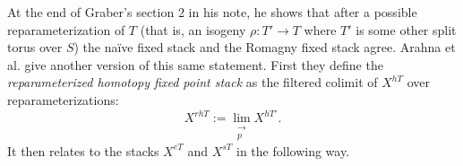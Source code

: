 At the end of Graber's section 2 in his note, he shows that after a possible reparameterization of \(T\) (that is, an isogeny \(\rho:T'\to T\) where \(T'\) is some other split torus over \(S\)) the na\"ive fixed stack and the Romagny fixed stack agree. Arahna et al. give another version of this same statement. First they define the \emph{reparameterized homotopy fixed point stack} as the filtered colimit of \(X^{hT}\) over reparameterizations:
\[X^{rhT} := \lim_{\substack{\to \\ p}} X^{hT'}.\]
It then relates to the stacks \(X^{eT}\) and \(X^{sT}\) in the following way.





\newpage

\printbibliography
